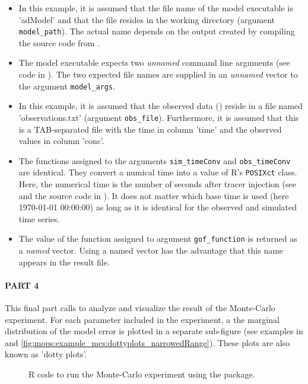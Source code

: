 \begin{itemize}
  \item In this example, it is assumed that the file name of the model executable is 'adModel' and that the file resides in the working directory (argument \texttt{model\_path}). The actual name depends on the output created by compiling the source code from .
  \item The model executable expects two \emph{unnamed} command line arguments (see code in ). The two expected file names are supplied in an \emph{unnamed} vector to the argument \texttt{model\_args}.
  \item In this example, it is assumed that the observed data () reside in a file named 'observations.txt' (argument \texttt{obs\_file}). Furthermore, it is assumed that this is a TAB-separated file with the time in column 'time' and the observed values in column 'conc'.
  \item The functions assigned to the arguments \texttt{sim\_timeConv} and \texttt{obs\_timeConv} are identical. They convert a numical time into a value of R's \texttt{POSIXct} class. Here, the numerical time is the number of seconds after tracer injection (see  and the source code in ). It does not matter which base time is used (here 1970-01-01 00:00:00) as long as it is identical for the observed and simulated time series.
  \item The value of the function assigned to argument \texttt{gof\_function} is returned as a \emph{named} vector. Using a named vector has the advantage that this name appears in the result file.
\end{itemize}

\paragraph{PART 4} This final part calls  to analyze and visualize the result of the Monte-Carlo experiment. For each parameter included in the experiment, a the marginal distribution of the model error is plotted in a separate sub-figure (see examples in  and \ref{fig:mops:example_mcs:dottyplots_narrowedRange}). These plots are also known as 'dotty plots'.

\begin{figure*}
  
  \caption{R code to run the Monte-Carlo experiment using the  package. \label{fig:mops:example_mcs:driver}}
\end{figure*}

